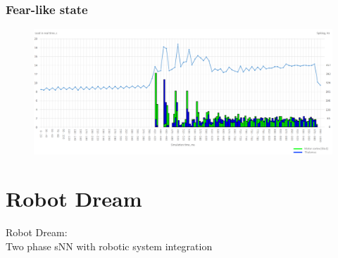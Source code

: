 \documentclass[12pt, aspectratio=169]{beamer}
\begin{document}


\begin{frame}
\frametitle{Fear-like state}
\begin{figure}
\includegraphics[width=1.0\textwidth]{resultBIG}
\end{figure}
\end{frame}



\section{Robot Dream}
\begin{frame}
  Robot Dream:\\
  Two phase sNN with robotic system integration
\end{frame}

\end{document}
